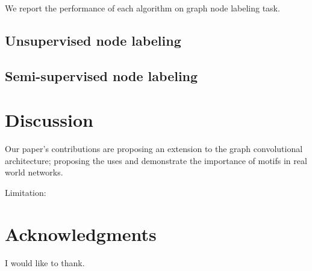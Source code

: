 \documentclass{article}
\theoremstyle{definition}
\begin{document}
We report the performance of each algorithm on graph node
labeling task.

\subsection{Unsupervised node labeling}

\begin{table}[H]
\centering
{}
\caption{F1-macro score for multiclass labeling}
\label{t:re}
\end{table}

\subsection{Semi-supervised node labeling}


\section{Discussion}

Our paper's contributions are proposing an extension to the graph convolutional 
architecture; proposing the uses and demonstrate the importance of motifs in
real world networks.

Limitation: 


\section*{Acknowledgments}

I would like to thank.



\end{document}
